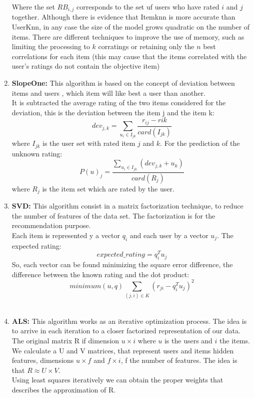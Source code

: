 \documentclass[letterpaper, 10 pt, conference]{ieeeconf}  %
\begin{document}
\begin{enumerate}
    Where the set $RB_{i,j}$ corresponds to the set uf users who have rated $i$ and $j$ together. Although there is evidence that Itemknn is more accurate than UserKnn, in any case the size of the model grows quadratic on the number of items. There are different techniques to improve the use of memory, such as limiting the processing to $k$ corratings or retaining only the $n$ best correlations for each item (this may cause that the items correlated with the user's ratings do not contain the objective item)
    
    \item \textbf{SlopeOne: }
    This algorithm is based on the concept of deviation between items and users \cite{c7}, which item will like best a user than another.\\
    It is subtracted the average rating of the two items considered for the deviation, this is the deviation between the item j and the item k:
    \begin{equation}
        dev_{j,k} = \sum_{u_i\in I_{jk}} \frac{r_{ij}-r{ik}}{card(I_{jk})}
    \end{equation}
    where $I_{jk}$ is the user set with rated item $j$ and $k$.
    For the prediction of the unknown rating:
    \begin{equation}
        P(u)_j = \frac{\sum_{u_i\in I_{jk}}(dev_{j,k}+u_k)}{card(R_j)}
    \end{equation}
    where $R_j$ is the item set which are rated by the user.\\
    
    \item \textbf{SVD: }
    This algorithm consist in a matrix factorization technique, to reduce the number of features of the data set. The factorization is for the recommendation purpose.\\
    Each item is represented y a vector $q_i$ and each user by a vector $u_j$. The expected rating:
    \begin{equation}
        expected\_rating = q_i^Tu_j
    \end{equation}
    So, each vector can be found minimizing the square error difference, the difference between the known rating and the dot product:
    \begin{equation}
        minimum(u,q) \sum_{(j,i)\in K}(r_{ji}-q_i^Tu_j)^2
    \end{equation}
    \\
    
    \item \textbf{ALS: } 
    This algorithm works as an iterative optimization process. The idea is to arrive in each iteration to a closer factorized representation of our data.\\
    The original matrix R if dimension $u\times i$ where $u$ is the users and $i$ the items. We calculate a U and V matrices, that represent users and items hidden features, dimensions $u\times f$ and $f \times i$, f the number of features. The idea is that $R\approx U\times V$.\\
    Using least squares iteratively we can obtain the proper weights that describes the approximation of R.\\
    

\end{enumerate}
\end{document}
